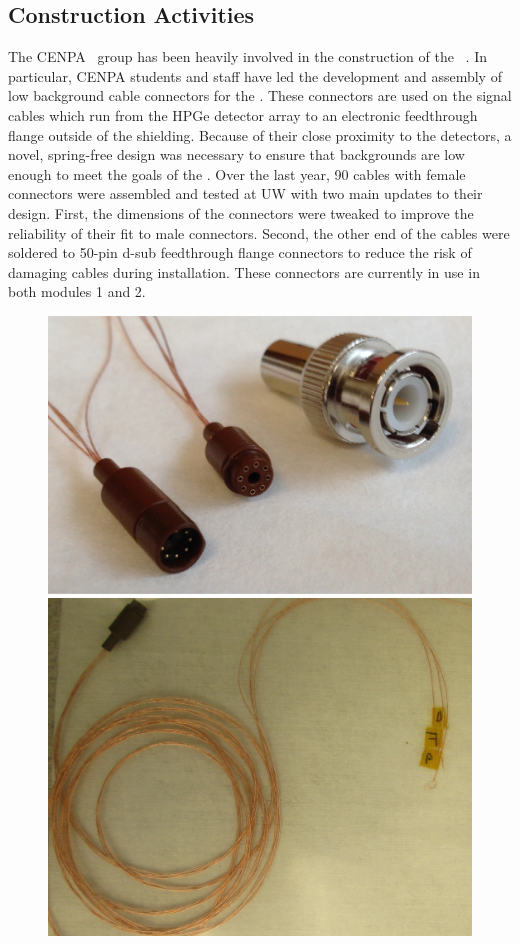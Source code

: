 \subsection{Construction Activities \label{MJConArticle}}



\noindent     %
The CENPA \MJ~group has been heavily involved in the construction of the \MJ\ \MJDemo. In particular, CENPA students and staff have led the development and assembly of low background cable connectors for the \MJDemo. These connectors are used on the signal cables which run from the HPGe detector array to an electronic feedthrough flange outside of the shielding. Because of their close proximity to the detectors, a novel, spring-free design was necessary to ensure that backgrounds are low enough to meet the goals of the \MJDemo. Over the last year, 90 cables with female connectors were assembled and tested at UW with two main updates to their design. First, the dimensions of the connectors were tweaked to improve the reliability of their fit to male connectors. Second, the other end of the cables were soldered to 50-pin d-sub feedthrough flange connectors to reduce the risk of damaging cables during installation. These connectors are currently in use in both modules 1 and 2.

\begin{figure}[h]
  \hfil  \includegraphics[width=.5\textwidth]{SigConBNCComparison.jpg} \hfil 
  \hfil  \includegraphics[width=.415\textwidth]{signal_bundle.JPG} \hfil 
  
  
  \label{MJConnectors}  %
  
\end{figure}


